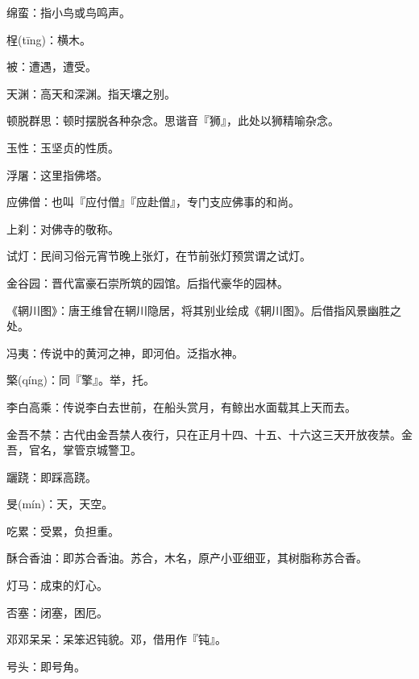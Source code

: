 \startbuffer[2327]
绵蛮：指小鸟或鸟鸣声。
\stopbuffer


\startbuffer[2328]
桯(tīng)：横木。
\stopbuffer


\startbuffer[2329]
被：遭遇，遭受。
\stopbuffer


\startbuffer[2330]
天渊：高天和深渊。指天壤之别。
\stopbuffer


\startbuffer[2331]
顿脱群思：顿时摆脱各种杂念。思谐音『狮』，此处以狮精喻杂念。
\stopbuffer


\startbuffer[2332]
玉性：玉坚贞的性质。
\stopbuffer


\startbuffer[2333]
浮屠：这里指佛塔。
\stopbuffer


\startbuffer[2334]
应佛僧：也叫『应付僧』『应赴僧』，专门支应佛事的和尚。
\stopbuffer


\startbuffer[2335]
上刹：对佛寺的敬称。
\stopbuffer


\startbuffer[2336]
试灯：民间习俗元宵节晚上张灯，在节前张灯预赏谓之试灯。
\stopbuffer


\startbuffer[2337]
金谷园：晋代富豪石崇所筑的园馆。后指代豪华的园林。
\stopbuffer


\startbuffer[2338]
《辋川图》：唐王维曾在辋川隐居，将其别业绘成《辋川图》。后借指风景幽胜之处。
\stopbuffer


\startbuffer[2339]
冯夷：传说中的黄河之神，即河伯。泛指水神。
\stopbuffer


\startbuffer[2340]
檠(qíng)：同『擎』。举，托。
\stopbuffer


\startbuffer[2341]
李白高乘：传说李白去世前，在船头赏月，有鲸出水面载其上天而去。
\stopbuffer


\startbuffer[2342]
金吾不禁：古代由金吾禁人夜行，只在正月十四、十五、十六这三天开放夜禁。金吾，官名，掌管京城警卫。
\stopbuffer


\startbuffer[2343]
躧跷：即踩高跷。
\stopbuffer


\startbuffer[2344]
旻(mín)：天，天空。
\stopbuffer


\startbuffer[2345]
吃累：受累，负担重。
\stopbuffer


\startbuffer[2346]
酥合香油：即苏合香油。苏合，木名，原产小亚细亚，其树脂称苏合香。
\stopbuffer


\startbuffer[2347]
灯马：成束的灯心。
\stopbuffer


\startbuffer[2348]
否塞：闭塞，困厄。
\stopbuffer


\startbuffer[2349]
邓邓呆呆：呆笨迟钝貌。邓，借用作『钝』。
\stopbuffer


\startbuffer[2350]
号头：即号角。
\stopbuffer


